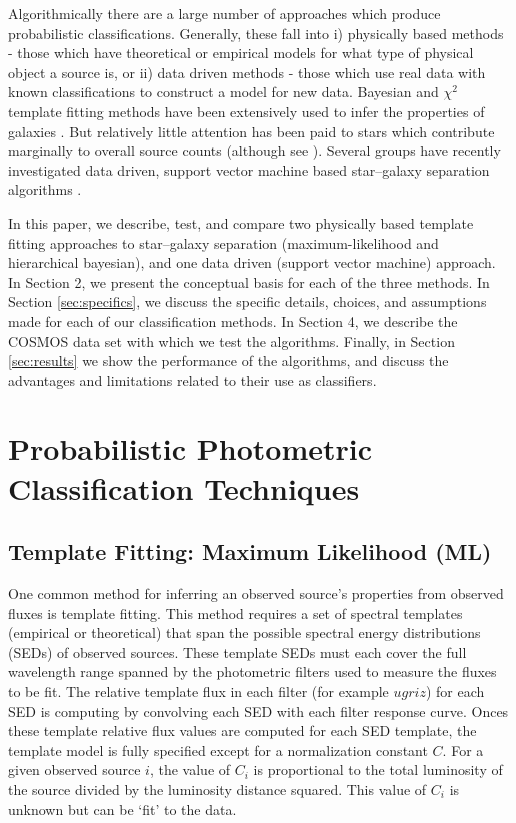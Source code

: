 \documentclass[12pt,preprint]{aastex}
\begin{document}
Algorithmically there are a large number of approaches which produce
probabilistic classifications.  Generally, these fall into i)
physically based methods - those which have theoretical or empirical
models for what type of physical object a source is, or ii) data
driven methods - those which use real data with known classifications
to construct a model for new data.  Bayesian and $\chi^2$ template
fitting methods have been extensively used to infer the properties of
galaxies \citep[e.g.][]{coil04a, ilbert09, xia09,
  walcher11a,hildebrandt10}. But relatively little attention has been
paid to stars which contribute marginally to overall source counts
(although see \citealt{robin07}).  Several groups have recently
investigated data driven, support vector machine based star--galaxy
separation algorithms \citep[e.g.][]{saglia12,solarz12a,tsalmantza12a}.

In this paper, we describe, test, and compare two physically based
template fitting approaches to star--galaxy separation
(maximum-likelihood and hierarchical bayesian), and one data driven
(support vector machine) approach.  In Section 2, we present the
conceptual basis for each of the three methods.  In Section
\ref{sec:specifics}, we discuss the specific details, choices, and
assumptions made for each of our classification methods.  In Section
4, we describe the COSMOS data set with which we test the algorithms.
Finally, in Section \ref{sec:results} we show the performance of the
algorithms, and discuss the advantages and limitations related to
their use as classifiers.


%
%
\section{Probabilistic Photometric Classification Techniques}

\subsection{Template Fitting: Maximum Likelihood (ML)}
\label{ssec:MLmethod}

One common method for inferring an observed source's properties from
observed fluxes is template fitting.  This method requires a set of
spectral templates (empirical or theoretical) that span the possible
spectral energy distributions (SEDs) of observed sources.  These
template SEDs must each cover the full wavelength range spanned by the
photometric filters used to measure the fluxes to be fit.  The
relative template flux in each filter (for example $ugriz$) for each
SED is computing by convolving each SED with each filter response
curve.  Onces these template relative flux values are computed for
each SED template, the template model is fully specified except for a
normalization constant $C$.  For a given observed source $i$, the
value of $C_i$ is proportional to the total luminosity of the source
divided by the luminosity distance squared.  This value of $C_i$ is
unknown but can be `fit' to the data.
\end{document}

